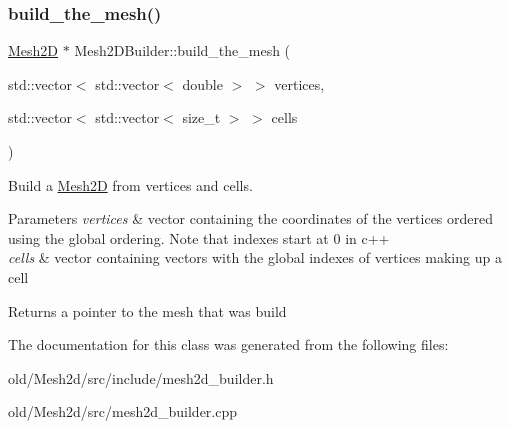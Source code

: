 \subsubsection{\texorpdfstring{build\+\_\+the\+\_\+mesh()}{build\_the\_mesh()}}
{\footnotesize\ttfamily \hyperlink{classMeshFramework2D_1_1Mesh2D}{Mesh2D} $\ast$ Mesh2\+D\+Builder\+::build\+\_\+the\+\_\+mesh (\begin{DoxyParamCaption}\item[{std\+::vector$<$ std\+::vector$<$ double $>$ $>$}]{vertices,  }\item[{std\+::vector$<$ std\+::vector$<$ size\+\_\+t $>$ $>$}]{cells }\end{DoxyParamCaption})}



Build a \hyperlink{classMeshFramework2D_1_1Mesh2D}{Mesh2D} from vertices and cells. 


\begin{DoxyParams}{Parameters}
{\em vertices} & vector containing the coordinates of the vertices ordered using the global ordering. Note that indexes start at 0 in c++ \\
\hline
{\em cells} & vector containing vectors with the global indexes of vertices making up a cell\\
\hline
\end{DoxyParams}
\begin{DoxyReturn}{Returns}
a pointer to the mesh that was build 
\end{DoxyReturn}


The documentation for this class was generated from the following files\+:\begin{DoxyCompactItemize}
\item 
old/\+Mesh2d/src/include/mesh2d\+\_\+builder.\+h\item 
old/\+Mesh2d/src/mesh2d\+\_\+builder.\+cpp\end{DoxyCompactItemize}

